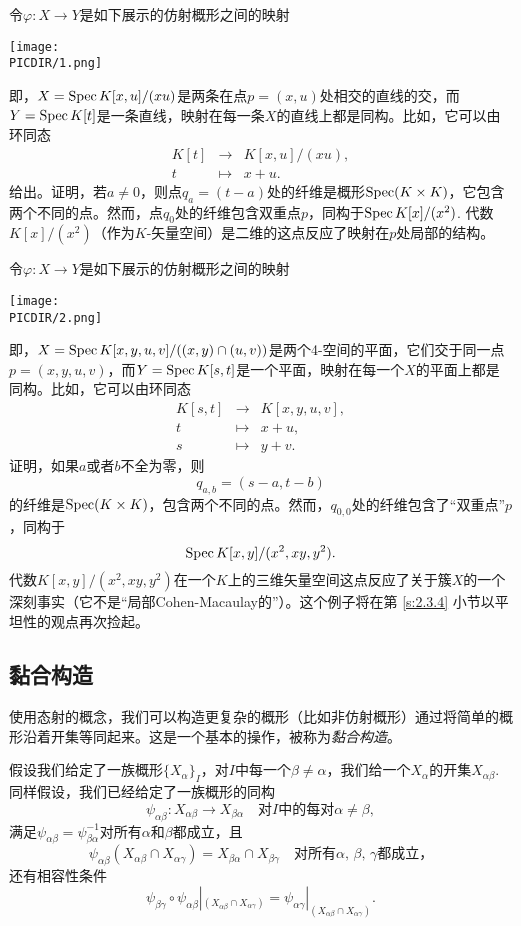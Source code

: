 \begin{exe}\label{exe:1.43}
\begin{compactenum}[(a)]
\item 令$\varphi:X\to Y$是如下展示的仿射概形之间的映射
\begin{center}\texttt{[image: \\PICDIR/1.png]}\end{center}
即，$X=\operatorname{Spec} K[x,u]/(xu)$是两条在点$p=(x,u)$处相交的直线的交，而$Y=\operatorname{Spec} K[t]$是一条直线，映射在每一条$X$的直线上都是同构。比如，它可以由环同态
\[
	\begin{array}{rcl}
	K[t]&\to &K[x,u]/(xu),\\
	t&\mapsto&x+u.
	\end{array}
\]
给出。证明，若$a\neq 0$，则点$q_a=(t-a)$处的纤维是概形$\operatorname{Spec}(K\times K)$，它包含两个不同的点。然而，点$q_0$处的纤维包含双重点$p$，同构于$\operatorname{Spec} K[x]/(x^2)$. 代数$K[x]/(x^2)$（作为$K$-矢量空间）是二维的这点反应了映射在$p$处局部的结构。
\item 令$\varphi:X\to Y$是如下展示的仿射概形之间的映射
\begin{center}\texttt{[image: \\PICDIR/2.png]}\end{center}
即，$X=\operatorname{Spec} K[x,y,u,v]/((x,y)\cap (u,v))$是两个4-空间的平面，它们交于同一点$p=(x,y,u,v)$，而$Y=\operatorname{Spec} K[s,t]$是一个平面，映射在每一个$X$的平面上都是同构。比如，它可以由环同态
\[
	\begin{array}{rcl}
	K[s,t]&\to &K[x,y,u,v],\\
	t&\mapsto&x+u,\\
	s&\mapsto&y+v.
	\end{array}
\]
证明，如果$a$或者$b$不全为零，则
\[
	q_{a,b}=(s-a,t-b)
\]
的纤维是$\operatorname{Spec}(K\times K)$，包含两个不同的点。然而，$q_{0,0}$处的纤维包含了“双重点”$p$，同构于
\[
	\operatorname{Spec} K[x,y]/(x^2,xy,y^2).
\]
代数$K[x,y]/(x^2,xy,y^2)$在一个$K$上的三维矢量空间这点反应了关于簇$X$的一个深刻事实（它不是“局部Cohen-Macaulay的”）。这个例子将在第 \ref{s:2.3.4} 小节以平坦性的观点再次捡起。
\end{compactenum}
\end{exe}

\subsection{黏合构造}

使用态射的概念，我们可以构造更复杂的概形（比如非仿射概形）通过将简单的概形沿着开集等同起来。这是一个基本的操作，被称为\textit{黏合构造}。

假设我们给定了一族概形$\{X_\alpha\}_I$，对$I$中每一个$\beta\neq \alpha$，我们给一个$X_\alpha$的开集$X_{\alpha\beta}$. 同样假设，我们已经给定了一族概形的同构
\[
	\psi_{\alpha\beta}:X_{\alpha\beta}\to X_{\beta\alpha}\quad \text{对$I$中的每对$\alpha\neq \beta$},
\]
满足$\psi_{\alpha\beta}=\psi_{\beta\alpha}^{-1}$对所有$\alpha$和$\beta$都成立，且
\[
	\psi_{\alpha\beta}(X_{\alpha\beta}\cap X_{\alpha\gamma})=X_{\beta\alpha}\cap X_{\beta\gamma}\quad \text{对所有$\alpha$, $\beta$, $\gamma$都成立，}
\]
还有相容性条件
\[
	\psi_{\beta\gamma}\circ \psi_{\alpha\beta}|_{(X_{\alpha\beta}\cap X_{\alpha\gamma})}=\psi_{\alpha\gamma}|_{(X_{\alpha\beta}\cap X_{\alpha\gamma})}.
\]

